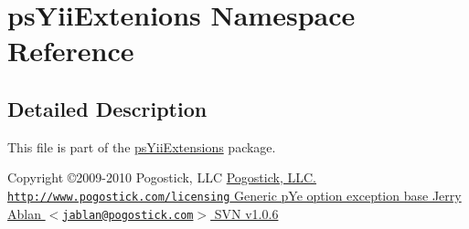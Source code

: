 \hypertarget{namespacepsYiiExtenions}{
\section{psYiiExtenions Namespace Reference}
\label{namespacepsYiiExtenions}
}


\subsection{Detailed Description}
This file is part of the \hyperlink{namespacepsYiiExtensions}{psYiiExtensions} package.

Copyright \copyright 2009-\/2010 Pogostick, LLC \hyperlink{}{Pogostick, LLC.  \href{http://www.pogostick.com/licensing}{\tt http://www.pogostick.com/licensing} Generic pYe option exception   base   Jerry Ablan $<$\href{mailto:jablan@pogostick.com}{\tt jablan@pogostick.com}$>$  SVN   v1.0.6   }